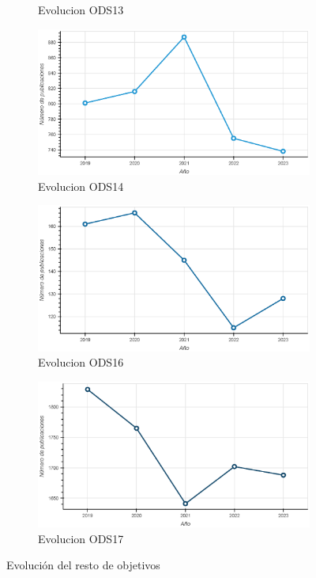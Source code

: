 \begin{figure}[H]
\begin{subfigure}{0.45\textwidth}
        \captionsetup{justification=centering}
        \caption{Evolucion ODS13}
        \label{fig:Evolucion ods13}
    \end{subfigure}
    \begin{subfigure}{0.45\textwidth}
        \includegraphics[width=0.9\linewidth]{imagenes/EvolucionOds14.eps} 
        \captionsetup{justification=centering}
        \caption{Evolucion ODS14}
        \label{fig:Evolucion ods14}
    \end{subfigure}
    \begin{subfigure}{0.45\textwidth}
        \includegraphics[width=0.9\linewidth]{imagenes/EvolucionOds16.eps} 
        \captionsetup{justification=centering}
        \caption{Evolucion ODS16}
        \label{fig:Evolucion ods16}
    \end{subfigure}
    \begin{subfigure}{0.45\textwidth}
        \includegraphics[width=0.9\linewidth]{imagenes/EvolucionOds17.eps} 
        \captionsetup{justification=centering}
        \caption{Evolucion ODS17}
        \label{fig:Evolucion ods17}
    \end{subfigure}
        \captionsetup{justification=centering}
    \caption{Evolución del resto de objetivos}
    \label{fig:Resto de tendencias}
\end{figure}

